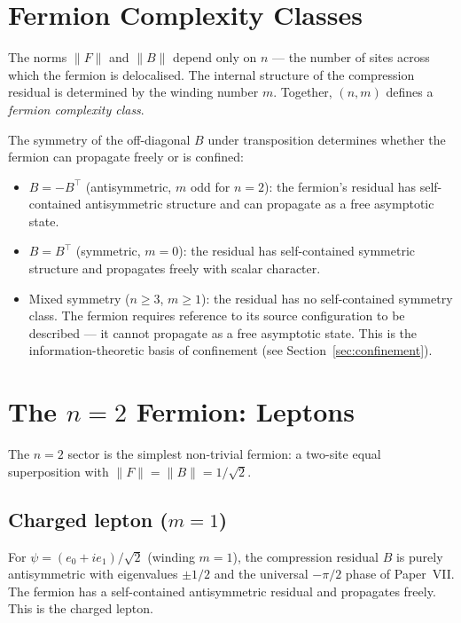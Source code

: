 \documentclass[11pt]{article}
\begin{document}
\section{Fermion Complexity Classes}
\label{sec:classes}

The norms $\|F\|$ and $\|B\|$ depend only on $n$ --- the number of
sites across which the fermion is delocalised.
The internal structure of the compression residual is determined
by the winding number $m$.
Together, $(n, m)$ defines a \emph{fermion complexity class}.

The symmetry of the off-diagonal $B$ under transposition determines
whether the fermion can propagate freely or is confined:

\begin{itemize}
  \item $B = -B^\top$ (antisymmetric, $m$ odd for $n{=}2$):
        the fermion's residual has self-contained antisymmetric
        structure and can propagate as a free asymptotic state.
  \item $B = B^\top$ (symmetric, $m{=}0$):
        the residual has self-contained symmetric structure
        and propagates freely with scalar character.
  \item Mixed symmetry ($n \geq 3$, $m \geq 1$):
        the residual has no self-contained symmetry class.
        The fermion requires reference to its source configuration
        to be described --- it cannot propagate as a free asymptotic
        state.
        This is the information-theoretic basis of confinement
        (see Section~\ref{sec:confinement}).
\end{itemize}

\section{The $n{=}2$ Fermion: Leptons}
\label{sec:n2}

The $n{=}2$ sector is the simplest non-trivial fermion: a two-site
equal superposition with $\|F\| = \|B\| = 1/\sqrt{2}$.

\subsection{Charged lepton ($m=1$)}

For $\psi = (e_0 + ie_1)/\sqrt{2}$ (winding $m{=}1$), the
compression residual $B$ is purely antisymmetric with eigenvalues
$\pm 1/2$ and the universal $-\pi/2$ phase of Paper~VII.
The fermion has a self-contained antisymmetric residual and
propagates freely.
This is the charged lepton.
\end{document}
